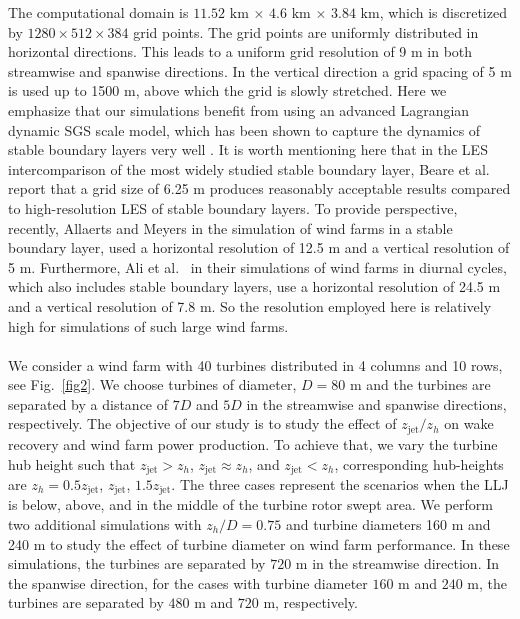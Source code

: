 \documentclass[%
 aip,
 amsmath,amssymb,
reprint,
twocolumn,%
author-numerical,%
]{revtex4-1}
\begin{document}
{\color{black} \indent The computational domain is $11.52$ $\text{km}$ $\times$ $4.6$ $\text{km}$ $\times$ $3.84$ $\text{km}$, which is discretized by $1280\times512\times384$ grid points. The grid points are uniformly distributed in horizontal directions. This leads to a uniform grid resolution of 9 m in both streamwise and spanwise directions. In the vertical direction a grid spacing of 5 m is used up to 1500 m, above which the grid is slowly stretched. Here we emphasize that our simulations benefit from using an advanced Lagrangian dynamic SGS scale model, which has been shown to capture the dynamics of stable boundary layers very well \cite{sto08, nag19}. It is worth mentioning here that in the LES intercomparison of the most widely studied stable boundary layer, Beare et al.\ \cite{bea06} report that a grid size of 6.25 m produces reasonably acceptable results compared to high-resolution LES of stable boundary layers. To provide perspective, recently, Allaerts and Meyers \cite{all18} in the simulation of wind farms in a stable boundary layer, used a horizontal resolution of 12.5 m and a vertical resolution of 5 m. Furthermore, Ali et al.\ \cite{ali17} in their simulations of wind farms in diurnal cycles, which also includes stable boundary layers, use a horizontal resolution of 24.5 m and a vertical resolution of 7.8 m. So the resolution employed here is relatively high for simulations of such large wind farms.}\\
\\
{\color{black} \indent We consider a wind farm with 40 turbines distributed in 4 columns and 10 rows, see Fig.\ \ref{fig2}. We choose turbines of diameter, $D=80$ m and the turbines are separated by a distance of $7D$ and $5D$ in the streamwise and spanwise directions, respectively. The objective of our study is to study the effect of $z_\text{jet}/z_h$ on wake recovery and wind farm power production. To achieve that, we vary the turbine hub height such that $z_\text{jet}>z_h$, $z_\text{jet}{\approx}z_h$, and $z_{\text{jet}} < z_h$, corresponding hub-heights are $z_h=0.5z_\text{jet}$, $z_\text{jet}$, $1.5z_\text{jet}$. The three cases represent the scenarios when the LLJ is below, above, and in the middle of the turbine rotor swept area. We perform two additional simulations with $z_h/D=0.75$ and turbine diameters 160 m and 240 m to study the effect of turbine diameter on wind farm performance. In these simulations, the turbines are separated by $720$ m in the streamwise direction. In the spanwise direction, for the cases with turbine diameter $160$ m and $240$ m, the turbines are separated by $480$ m and $720$ m, respectively.}\\
\end{document}
